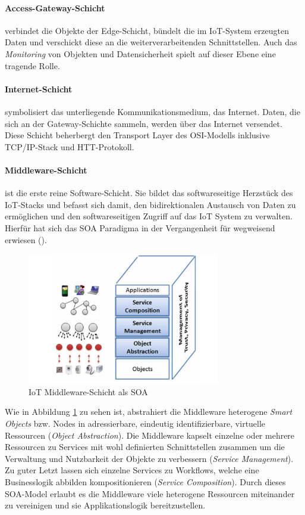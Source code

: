 \paragraph{Access-Gateway-Schicht} verbindet die Objekte der Edge-Schicht, bündelt die im \ac{IoT}-System erzeugten Daten und verschickt diese an die weiterverarbeitenden Schnittstellen. Auch das \textit{Monitoring} von Objekten und Datensicherheit spielt auf dieser Ebene eine tragende Rolle. 

\paragraph{Internet-Schicht} symbolisiert das unterliegende Kommunikationsmedium, das Internet. Daten, die sich an der  Gateway-Schichte sammeln, werden über das Internet versendet. Diese Schicht beherbergt den Transport Layer des OSI-Modells inklusive TCP/IP-Stack und HTT-Protokoll.

\paragraph{Middleware-Schicht} ist die erste reine Software-Schicht. Sie bildet das softwareseitige Herzstück des \ac{IoT}-Stacks und befasst sich damit, den bidirektionalen Austausch von Daten zu ermöglichen und den softwareseitigen Zugriff auf das \ac{IoT} System zu verwalten. Hierfür hat sich das \ac{SOA} Paradigma in der Vergangenheit für wegweisend erwiesen (\cite{laliwala2008event}).
\begin{figure}[h]
    \centering
    \includegraphics[width=0.75\textwidth]{bilder/chapter2/iotsoa.png}
    \caption{IoT Middleware-Schicht als \ac{SOA}}
    \label{fig:iotsoa}
\end{figure}
Wie in Abbildung \ref{fig:iotsoa} zu sehen ist, abstrahiert die Middleware heterogene \textit{Smart Objects} bzw. Nodes in adressierbare, eindeutig identifizierbare, virtuelle Ressourcen (\textit{Object Abstraction}). Die Middleware kapselt einzelne oder mehrere Ressourcen zu Services mit wohl definierten Schnittstellen zusammen um die Verwaltung und Nutzbarkeit der Objekte zu verbessern (\textit{Service Management}). Zu guter Letzt lassen sich einzelne Services zu Workflows, welche eine Businesslogik abbilden kompositionieren (\textit{Service Composition}). Durch dieses \ac{SOA}-Model erlaubt es die Middleware viele heterogene Ressourcen miteinander zu vereinigen und sie Applikationslogik bereitzustellen. 

